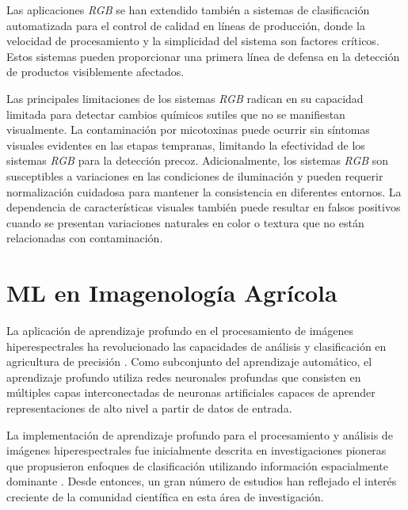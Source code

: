 \vspace{5mm}

Las aplicaciones \emph{RGB} se han extendido también a sistemas de clasificación automatizada para el control de calidad en líneas de producción, donde la velocidad de procesamiento y la simplicidad del sistema son factores críticos. Estos sistemas pueden proporcionar una primera línea de defensa en la detección de productos visiblemente afectados.

\vspace{5mm}

Las principales limitaciones de los sistemas \emph{RGB} radican en su capacidad limitada para detectar cambios químicos sutiles que no se manifiestan visualmente. La contaminación por micotoxinas puede ocurrir sin síntomas visuales evidentes en las etapas tempranas, limitando la efectividad de los sistemas \emph{RGB} para la detección precoz. Adicionalmente, los sistemas \emph{RGB} son susceptibles a variaciones en las condiciones de iluminación y pueden requerir normalización cuidadosa para mantener la consistencia en diferentes entornos. La dependencia de características visuales también puede resultar en falsos positivos cuando se presentan variaciones naturales en color o textura que no están relacionadas con contaminación.

\section{ML en Imagenología Agrícola}

La aplicación de aprendizaje profundo en el procesamiento de imágenes hiperespectrales ha revolucionado las capacidades de análisis y clasificación en agricultura de precisión \cite{PAOLETTI2019279}. Como subconjunto del aprendizaje automático, el aprendizaje profundo utiliza redes neuronales profundas que consisten en múltiples capas interconectadas de neuronas artificiales capaces de aprender representaciones de alto nivel a partir de datos de entrada.

\vspace{5mm}

La implementación de aprendizaje profundo para el procesamiento y análisis de imágenes hiperespectrales fue inicialmente descrita en investigaciones pioneras que propusieron enfoques de clasificación utilizando información espacialmente dominante \cite{chen2014deep}. Desde entonces, un gran número de estudios han reflejado el interés creciente de la comunidad científica en esta área de investigación.

